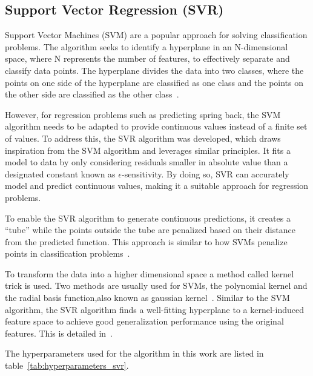 \subsection{Support Vector Regression (SVR)}\label{subsec:support-vector-regression-(svr)}
Support Vector Machines (\ac{SVM}) are a popular approach for solving classification
problems.
The algorithm seeks to identify a hyperplane in an N-dimensional space, where N
represents the number of features, to effectively separate and classify data
points.
The hyperplane divides the data into two classes, where the points on one side of the
hyperplane are classified as one class and the points on the other side are classified as
the other class~\cite[p. 42]{awad_efficientlearningmachines_2015}.

However, for regression problems such as predicting spring back, the \ac{SVM} algorithm
needs to be adapted to provide continuous values instead of a finite set of values.
To address this, the \ac{SVR} algorithm was developed, which draws inspiration from the
\ac{SVM} algorithm and leverages similar principles.
It fits a model to data by only considering residuals smaller in absolute value
than a designated constant known as $\epsilon$-sensitivity.
By doing so, \ac{SVR} can accurately model and predict continuous values, making it a
suitable approach for regression problems.

To enable the \ac{SVR} algorithm to generate continuous predictions, it creates a ``tube''
while the points outside the tube are penalized based on their distance from the
predicted function.
This approach is similar to how \ac{SVM}s penalize points in classification
problems~\cite[p. 369]{montesinoslopez_supportvectormachines_2022}.

To transform the data into a higher dimensional space a method called kernel trick is used.
Two methods are usually used for \ac{SVM}s, the polynomial kernel and the radial basis
function,also known as gaussian kernel~\cite[p. 97--98]{
    muller_introductionmachinelearning_2016}.
Similar to the \ac{SVM} algorithm, the \ac{SVR} algorithm finds a well-fitting hyperplane to a
kernel-induced feature space to achieve good generalization performance using the original
features.
This is detailed in~\cite[p. 369]{montesinoslopez_supportvectormachines_2022}.

The hyperparameters used for the algorithm in this work are listed in
table~\ref{tab:hyperparameters_svr}.


